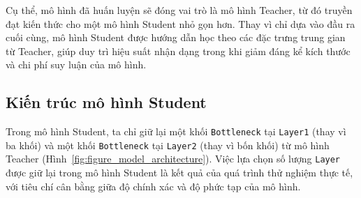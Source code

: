 Cụ thể, mô hình đã huấn luyện sẽ đóng vai trò là mô hình Teacher, từ đó truyền đạt kiến thức cho một mô hình Student nhỏ gọn hơn. Thay vì chỉ dựa vào đầu ra cuối cùng, mô hình Student được hướng dẫn học theo các đặc trưng trung gian từ Teacher, giúp duy trì hiệu suất nhận dạng trong khi giảm đáng kể kích thước và chi phí suy luận của mô hình.

\subsection{Kiến trúc mô hình Student}
%
%
Trong mô hình Student, ta chỉ giữ lại một khối \texttt{Bottleneck} tại \texttt{Layer1} (thay vì ba khối) và một khối \texttt{Bottleneck} tại \texttt{Layer2} (thay vì bốn khối) từ mô hình Teacher (Hình~\ref{fig:figure_model_architecture}).
%
Việc lựa chọn số lượng \texttt{Layer} được giữ lại trong mô hình Student là kết quả của quá trình thử nghiệm thực tế, với tiêu chí cân bằng giữa độ chính xác và độ phức tạp của mô hình.

